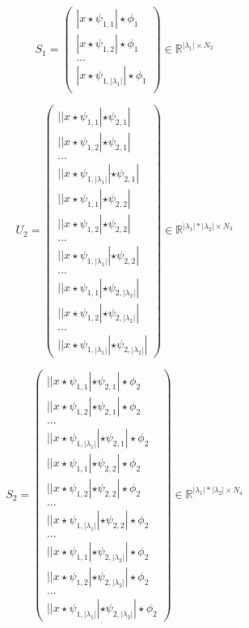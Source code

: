 \documentclass[a4paper]{report}
\begin{document}
\[
S_1=\left( \begin{matrix}
|x\star \psi_{1,1} | \star \phi_1 \\
|x\star \psi_{1,2} | \star \phi_1  \\
... \\
|x\star \psi_{1,|\lambda_1|} | \star \phi_1 \\
\end{matrix}
\right)
\in \mathbb{R}^{|\lambda_1|\times N_2}
\]

\[
U_2=\left( \begin{matrix}
||x\star \psi_{1,1} | \star \psi_{2,1} |\\
||x\star \psi_{1,2} | \star \psi_{2,1} |\\
... \\
||x\star \psi_{1,|\lambda_1|} |\star \psi_{2,1}|\\
||x\star \psi_{1,1} | \star \psi_{2,2} |\\
||x\star \psi_{1,2} | \star \psi_{2,2} |\\
... \\
||x\star \psi_{1,|\lambda_1|} |\star \psi_{2,2}|\\
...\\
||x\star \psi_{1,1} | \star \psi_{2,| \lambda_2|} |\\
||x\star \psi_{1,2} | \star \psi_{2,| \lambda_2|} |\\
... \\
||x\star \psi_{1,|\lambda_1|} |\star \psi_{2,| \lambda_2|}|
\end{matrix}
\right)
\in \mathbb{R}^{|\lambda_1|* | \lambda_2 |\times N_3}
\]

\[
S_2=\left( \begin{matrix}
||x\star \psi_{1,1} | \star \psi_{2,1} |\star \phi_2 \\
||x\star \psi_{1,2} | \star \psi_{2,1} |\star\phi_2 \\
... \\
||x\star \psi_{1,|\lambda_1|} |\star \psi_{2,1}|\star\phi_2 \\
||x\star \psi_{1,1} | \star \psi_{2,2} |\star\phi_2 \\
||x\star \psi_{1,2} | \star \psi_{2,2} |\star\phi_2 \\
... \\
||x\star \psi_{1,|\lambda_1|} |\star \psi_{2,2}|\star\phi_2 \\
...\\
||x\star \psi_{1,1} | \star \psi_{2,| \lambda_2|} |\star\phi_2 \\
||x\star \psi_{1,2} | \star \psi_{2,| \lambda_2|} |\star\phi_2 \\
... \\
||x\star \psi_{1,|\lambda_1|} |\star \psi_{2,| \lambda_2|}|\star\phi_2 
\end{matrix}
\right)
\in \mathbb{R}^{|\lambda_1|* | \lambda_2 |\times N_4}
\]
\end{document}
